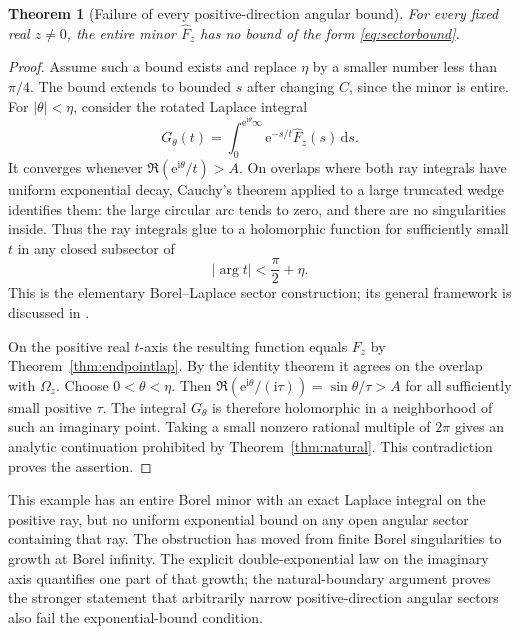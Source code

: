 \documentclass[11pt,a4paper]{article}
\numberwithin{equation}{section}
\newtheorem{theorem}{Theorem}[section]
\theoremstyle{definition}
\theoremstyle{remark}
\newcommand{\ii}{\mathrm i}
\newcommand{\e}{\mathrm e}
\newcommand{\dd}{\,\mathrm d}
\begin{document}
\begin{theorem}[Failure of every positive-direction angular bound]
\label{thm:nosector}
For every fixed real $z\ne0$, the entire minor $\widehat F_z$ has no bound of the form \eqref{eq:sectorbound}.
\end{theorem}
\begin{proof}
Assume such a bound exists and replace $\eta$ by a smaller number less than $\pi/4$. The bound extends to bounded $s$ after changing $C$, since the minor is entire. For $|\theta|<\eta$, consider the rotated Laplace integral
\begin{equation}
 G_\theta(t)=\int_0^{\e^{\ii\theta}\infty}
                     \e^{-s/t}\widehat F_z(s)\dd s.
 \label{eq:rotLap}
\end{equation}
It converges whenever $\Re(\e^{\ii\theta}/t)>A$. On overlaps where both ray integrals have uniform exponential decay, Cauchy's theorem applied to a large truncated wedge identifies them: the large circular arc tends to zero, and there are no singularities inside. Thus the ray integrals glue to a holomorphic function for sufficiently small $t$ in any closed subsector of
\[
 |\arg t|<\frac\pi2+\eta.
\]
This is the elementary Borel--Laplace sector construction; its general framework is discussed in \cite{sauzin}.

On the positive real $t$-axis the resulting function equals $F_z$ by Theorem~\ref{thm:endpointlap}. By the identity theorem it agrees on the overlap with $\Omega_z$. Choose $0<\theta<\eta$. Then $\Re(\e^{\ii\theta}/(\ii\tau))=\sin\theta/\tau>A$ for all sufficiently small positive $\tau$. The integral $G_\theta$ is therefore holomorphic in a neighborhood of such an imaginary point. Taking a small nonzero rational multiple of $2\pi$ gives an analytic continuation prohibited by Theorem~\ref{thm:natural}. This contradiction proves the assertion.
\end{proof}

This example has an entire Borel minor with an exact Laplace integral on the positive ray, but no uniform exponential bound on any open angular sector containing that ray. The obstruction has moved from finite Borel singularities to growth at Borel infinity. The explicit double-exponential law on the imaginary axis quantifies one part of that growth; the natural-boundary argument proves the stronger statement that arbitrarily narrow positive-direction angular sectors also fail the exponential-bound condition.
\end{document}
